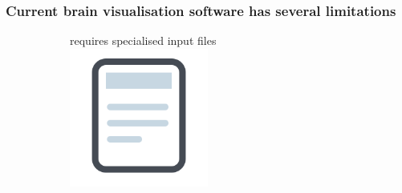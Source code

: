 \documentclass[10pt,xcolor=table,aspectratio=169]{beamer}
\newcommand{\xmark}{\ding{55}}%
\begin{document}
\begin{frame}[t]
 \frametitle{Current brain visualisation software has several limitations}


 
\newcommand{\myyes}{\textcolor{green1}{\Large{\textbf{\checkmark}}}}
\newcommand{\myno}{\textcolor{red1}{\Large{\xmark}}}

\begin{figure}
\centering
\begin{subfigure}[t]{0.3\textwidth}
\centering
 \begin{minipage}[t][3.5cm][t]{\textwidth}
 \centering
\myno requires specialised input files\\
\includegraphics[width=0.5\textwidth]{images/inputFile} 
 \end{minipage}


% 




\end{subfigure}
\end{figure}
\end{frame}
\end{document}
